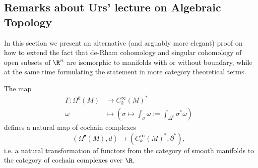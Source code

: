 \subsection{Remarks about Urs' lecture on Algebraic Topology}

In this section we present an alternative (and arguably more elegant) proof on how to extend the fact that de-Rham cohomology and singular cohomology of open subsets of $\R^n$ are isomorphic to manifolds with or without boundary, while at the same time formulating the statement in more category theoretical terms.

    \begin{lemma}
        \label{lem:natural_cochain_map1}
      The map
      \begin{align*}
        \Gamma \colon \Omega^k(M) & \to C_k^\infty(M)^\ast \\
        \omega &\mapsto (\sigma \mapsto \int_\sigma\omega := \int_{\Delta^k}\sigma^\ast\omega)
      \end{align*}
      defines a natural map of cochain complexes
      \[
      (\Omega^\bullet(M),d) \to (C_k^\infty(M)^\ast,\partial^\ast),
      \]
      i.e. a natural transformation of functors from the category of smooth manifolds to the category of cochain complexes over $\R$.
    \end{lemma}
